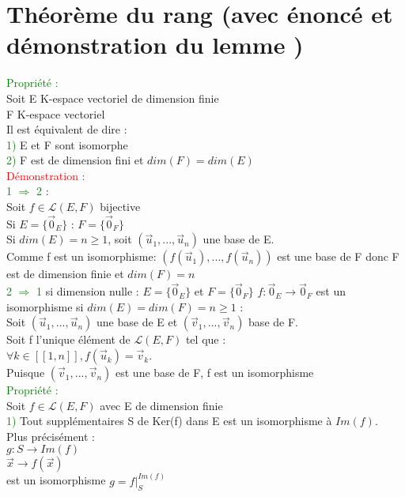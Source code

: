 \documentclass{article}
\begin{document}
\section{Théorème du rang (avec énoncé et démonstration du lemme )}
\textcolor{green}{Propriété :} \\
Soit E K-espace vectoriel de dimension finie \\
F K-espace vectoriel \\
Il est équivalent de dire : \\
\textcolor{green}{1)} E et F sont isomorphe \\
\textcolor{green}{2)} F est de dimension fini et $dim(F)=dim(E)$ \\
\textcolor{red}{Démonstration :} \\
\textcolor{green}{ 1 $\Rightarrow$ 2} : \\
Soit $f \in \mathcal L (E,F)$ bijective \\
Si $E= \lbrace \vec 0_E \rbrace$ : $F=\lbrace \vec 0_F \rbrace$ \\
Si $dim(E)=n \geq 1$, soit $(\vec u_1,..., \vec u_n)$ une base de E. \\
Comme f est un isomorphisme: $(f(\vec u_1),...,f(\vec u_n))$ est une base de F donc F est de dimension finie et $dim(F)=n$ \\
\textcolor{green}{2 $\Rightarrow$ 1} si dimension nulle : $E=\lbrace  \vec 0_E \rbrace$ et $F=\lbrace \vec 0_F \rbrace$ $f: \vec 0_E \rightarrow \vec 0_F$ est un isomorphisme si $dim(E)=dim(F)=n \geq 1$ : \\
Soit $(\vec u_1,..., \vec u_n)$ une base de E et $(\vec v_1,..., \vec v_n)$ base de F. \\
Soit f l'unique élément de $\mathcal L (E,F)$ tel que : \\
$\forall k \in [[1,n]],f(\vec u_k)=\vec v_k$. \\
Puisque $(\vec v_1,..., \vec v_n)$ est une base de F, f est un isomorphisme \\ 
\textcolor{green}{Propriété :} \\
Soit $f \in \mathcal L (E,F)$ avec E de dimension finie \\
\textcolor{green}{1)} Tout supplémentaires S de Ker(f) dans E est un isomorphisme à $Im(f)$. \\
Plus précisément : \\
$g: S \rightarrow Im(f)$ \\
$ \vec x \rightarrow f(\vec x)$ \\
est un isomorphisme $g= f|_{S}^{Im(f)}$ \\
\end{document}
